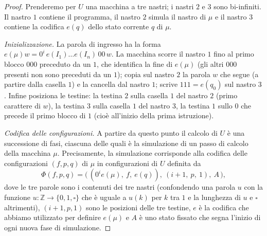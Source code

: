 \begin{proof}
Prenderemo per $U$ una macchina a tre nastri; i nastri $2$ e $3$ sono bi-infiniti. Il nastro $1$ contiene il programma, il nastro $2$ simula il nastro di $\mu$ e il nastro $3$ contiene la codifica $e(q)$ dello stato corrente $q$ di $\mu$.

\medskip
\noindent\emph{Inizializzazione.} La parola di ingresso ha la forma $e(\mu)w=0^i\,e(I_1)\dots e(I_n)\,00\,w$. La macchina scorre il nastro $1$ fino al primo blocco $000$ preceduto da un $1$, che identifica la fine di $e(\mu)$ (gli altri $000$ presenti non sono preceduti da un $1$); copia sul nastro $2$ la parola $w$ che segue (a partire dalla casella $1$) e la cancella dal nastro $1$; scrive $111=e(q_0)$ sul nastro $3$. Infine posiziona le testine: la testina $2$ sulla casella $1$ del nastro $2$ (primo carattere di $w$), la testina $3$ sulla casella $1$ del nastro $3$, la testina $1$ sullo $0$ che precede il primo blocco di $1$ (cioè all'inizio della prima istruzione).

\medskip
\noindent\emph{Codifica delle configurazioni.} A partire da questo punto il calcolo di $U$ è una successione di fasi, ciascuna delle quali è la simulazione di un passo di calcolo della macchina $\mu$. Precisamente, la simulazione corrisponde alla codifica delle configurazioni $(f,p,q)$ di $\mu$ in configurazioni di $U$ definita da
\[
\Phi(f,p,q)=\bigl(\,(0^i e(\mu),\ f,\ e(q)),\ (i+1,\ p,\ 1),\ A\,\bigr),
\]
dove le tre parole sono i contenuti dei tre nastri (confondendo una parola $u$ con la funzione $u\colon\mathbb Z\to\{0,1,\square\}$ che è uguale a $u(k)$ per $k$ tra $1$ e la lunghezza di $u$ e $\square$ altrimenti), $(i+1,p,1)$ sono le posizioni delle tre testine, $e$ è la codifica che abbiamo utilizzato per definire $e(\mu)$ e $A$ è uno stato fissato che segna l'inizio di ogni nuova fase di simulazione.


\end{proof}
